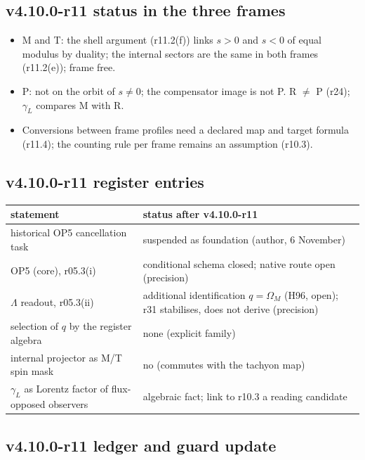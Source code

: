 \subsection*{v4.10.0-r11 status in the three frames}
\label{subsec:v4100-r11-frames}

\begin{itemize}[leftmargin=2em]
\item M and T: the shell argument (r11.2(f)) links \(s>0\) and \(s<0\) of equal modulus by duality; the internal sectors are the same in both frames (r11.2(e));
frame free.
\item P: not on the orbit of \(s\neq0\); the compensator image is not P.  R \(\neq\) P (r24); \(\gamma_L\) compares M with R.
\item Conversions between frame profiles need a declared map and target formula (r11.4); the counting rule per frame remains an assumption (r10.3).
\end{itemize}

\subsection*{v4.10.0-r11 register entries}
\label{subsec:v4100-r11-register}

\begin{center}
\small
\begin{tabular}{@{}>{\raggedright\arraybackslash}p{}>{\raggedright\arraybackslash}p{}@{}}
\toprule
statement & status after v4.10.0-r11\\
\midrule
historical OP5 cancellation task & suspended as foundation (author, 6 November)\\
OP5 (core), r05.3(i) & conditional schema closed; native route open (precision)\\
\(\Lambda\) readout, r05.3(ii) & additional identification \(q=\Omega_M\) (H96, open); r31 stabilises, does not derive (precision)\\
selection of \(q\) by the register algebra & none (explicit family)\\
internal projector as M/T spin mask & no (commutes with the tachyon map)\\
\(\gamma_L\) as Lorentz factor of flux-opposed observers & algebraic fact; link to r10.3 a reading candidate\\
\bottomrule
\end{tabular}
\end{center}

\subsection*{v4.10.0-r11 ledger and guard update}
\label{subsec:v4100-r11-ledger-guard}

